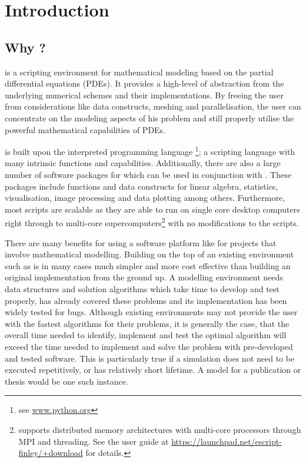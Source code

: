 
%
%
%

\chapter{Introduction}
\label{CHAP INTRO}
\section{Why \esc?}
\esc is a scripting environment for mathematical modeling based on the partial differential equations (PDEs). It provides a high-level of abstraction from the underlying numerical schemes and their implementations. By freeing the user from considerations like data constructs, meshing and parallelisation, the user can concentrate on the modeling aspects of his problem and still properly utilise the powerful mathematical capabilities of PDEs. 

\esc is built upon the interpreted programming language \pyt\footnote{see \url{www.python.org}}; a scripting language with many intrinsic functions and capabilities. Additionally, there are also a large number of software packages for \pyt which can be used in conjunction with \esc. These packages include functions and data constructs for linear algebra, statistics, visualisation, image processing and data plotting among others. Furthermore, most \esc scripts are scalable as they are able to run on single core desktop computers right through to multi-core supercomputers\footnote{\esc supports distributed memory architectures with multi-core processors through MPI and threading. See the \esc user guide at \url{https://launchpad.net/escript-finley/+download} for details.} with no modifications to the scripts. 

There are many benefits for using a software platform like \esc for projects that involve mathematical modelling. Building on the top of an existing environment such as \esc is in many cases much simpler and more cost effective than building an original implementation from the ground up. A modelling environment needs data structures and solution algorithms which take time to develop and test properly, \esc has already covered these problems and its implementation has been widely tested for bugs. Although existing environments may not provide the user with the fastest algorithms for their problems, it is generally the case, that the overall time needed to identify, implement and test the optimal algorithm will exceed the time needed to implement and solve the problem with pre-developed and tested software. This is particularly true if a simulation does not need to be executed repetitively, or has relatively short lifetime. A model for a publication or thesis would be one such instance. 

